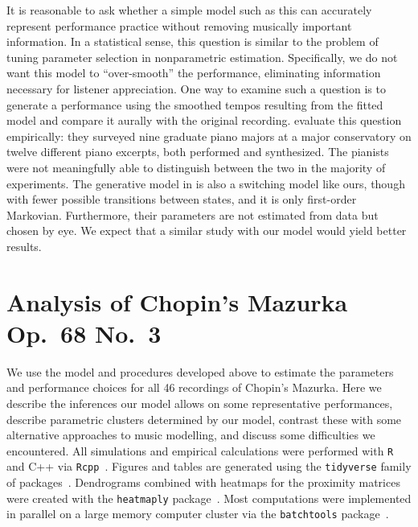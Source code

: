 \documentclass[aoas]{imsart}
\begin{document}
It is reasonable to ask whether a simple model such as this can
accurately represent performance practice without removing musically important
information. In a statistical sense, this question is similar to the
problem of tuning parameter selection in nonparametric
estimation. Specifically, we do not want this model to
``over-smooth'' the performance, eliminating information necessary for
listener appreciation. One way to examine such a question 
is to generate a performance using the smoothed tempos resulting from
the fitted model and compare it aurally with the original recording.
\citet{GuRaphael2012} evaluate this question empirically: they surveyed nine graduate piano majors at a
major conservatory on twelve different piano excerpts, both performed
and synthesized. The pianists
were not meaningfully able to distinguish between the two in the
majority of experiments.
The generative model in \citet{GuRaphael2012} is also a switching model like ours, though with fewer
possible transitions between states, and it is only first-order
Markovian. Furthermore, their parameters are not estimated from data but chosen
by eye. We expect that a similar
study with our model would yield better results.


\section{Analysis of Chopin's Mazurka Op.\ 68 No.\ 3}
\label{sec:analys-chop-mazurka}

We use the model and procedures developed above to estimate the
parameters and performance choices for all 46 recordings of Chopin's
Mazurka. Here we describe the inferences our model allows on some
representative performances, describe parametric clusters determined
by our model, contrast these with some alternative approaches to music
modelling, and discuss some difficulties we encountered. All simulations and empirical calculations were performed with
\texttt{R}~\citep{R-Core-Team2019} and C++ via \texttt{Rcpp}~\citep{Eddelbuettel2013}. Figures and tables are generated
using the \texttt{tidyverse} family of
packages~\citep{Wickham2017, Wickham2016}. Dendrograms combined with
heatmaps for the proximity matrices were created with the
\texttt{heatmaply} package~\citep{GaliliOCallaghan2017}.
Most
computations were implemented in parallel on a
large
memory computer cluster via
the \texttt{batchtools} package~\citep{LangBischl2017}. 
\end{document}
